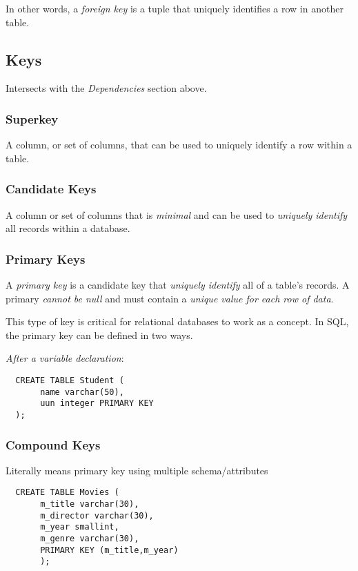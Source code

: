 \documentclass{article}
\begin{document}
In other words, a \textit{foreign key} is a tuple that uniquely identifies a row in another table.

\filbreak
\subsection{Keys}

Intersects with the \textit{Dependencies} section above.

\subsubsection*{Superkey}

A column, or set of columns, that can be used to uniquely identify a row within a table.

\subsubsection*{Candidate Keys}

A column or set of columns that is \textit{minimal} and can be used to \textit{uniquely identify} all records within a database.

\subsubsection*{Primary Keys}

A \textit{primary key} is a candidate key that \textit{uniquely identify} all of a table's records. A primary \textit{cannot be null} and must contain a \textit{unique value for each row of data}.

This type of key is critical for relational databases to work as a concept. In SQL, the primary key can be defined in two ways.

\textit{After a variable declaration}:

\begin{lstlisting}
  CREATE TABLE Student (
       name varchar(50),
       uun integer PRIMARY KEY
  );
\end{lstlisting}

\subsubsection*{Compound Keys}
Literally means primary key using multiple schema/attributes

\begin{lstlisting}
  CREATE TABLE Movies (
       m_title varchar(30),
       m_director varchar(30),
       m_year smallint,
       m_genre varchar(30),
       PRIMARY KEY (m_title,m_year)
       );
\end{lstlisting}
\end{document}
